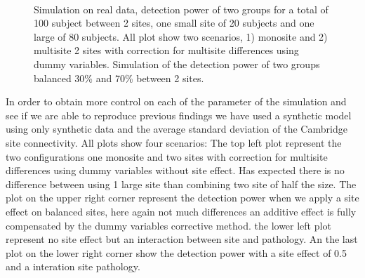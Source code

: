 \documentclass[authoryear]{elsarticle}
\begin{document}
\begin{figure}[t]
\centering
\captionsetup[subfloat]{labelformat=empty}
\\
\tiny Simulation on real data, detection power of two groups for a total of 100 subject between 2 sites, one small site of 20 subjects and one large of 80 subjects. All plot show two scenarios, 1) monosite and 2) multisite 2 sites with correction for multisite differences using dummy variables. Simulation of the detection power of two groups balanced 30\% and 70\% between 2 sites.
\label{fig_real_sim_debalancing_2sites}
\end{figure}
 
In order to obtain more control on each of the parameter of the simulation and see if we are able to reproduce previous findings we have used a synthetic model using only synthetic data and the average standard deviation of the Cambridge site connectivity. All plots show four scenarios: The top left plot represent the two configurations one monosite and two sites with correction for multisite differences using dummy variables without site effect. Has expected there is no difference between using 1 large site than combining two site of half the size. The plot on the upper right corner represent the detection power when we apply a site effect on balanced sites, here again not much differences an additive effect is fully compensated by the dummy variables corrective method. the lower left plot represent no site effect but an interaction between site and pathology. An the last plot on the lower right corner show the detection power with a site effect of 0.5 and a interation site pathology.
\end{document}
